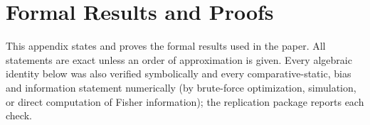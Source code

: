 
\section{Formal Results and Proofs}\label{app:proofs}

\setcounter{lemma}{0}\setcounter{proposition}{0}\setcounter{corollary}{0}\setcounter{definition}{0}\setcounter{remark}{0}
\renewcommand{\thelemma}{A\arabic{lemma}}
\renewcommand{\theproposition}{A\arabic{proposition}}
\renewcommand{\thecorollary}{A\arabic{corollary}}
\renewcommand{\thedefinition}{A\arabic{definition}}
\renewcommand{\theremark}{A\arabic{remark}}
\renewcommand{\theHlemma}{A\arabic{lemma}}\renewcommand{\theHproposition}{A\arabic{proposition}}
\renewcommand{\theHcorollary}{A\arabic{corollary}}\renewcommand{\theHdefinition}{A\arabic{definition}}\renewcommand{\theHremark}{A\arabic{remark}}
\providecommand{\Var}{\operatorname{Var}}
\providecommand{\Cov}{\operatorname{Cov}}
\providecommand{\E}{\mathbb{E}}

This appendix states and proves the formal results used in the paper. All statements are exact unless an order of
approximation is given. Every algebraic identity below was also verified symbolically and every comparative-static,
bias and information statement numerically (by brute-force optimization, simulation, or direct computation of Fisher
information); the replication package reports each check.

